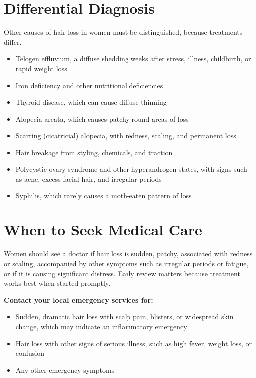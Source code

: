 \section*{Differential Diagnosis}
Other causes of hair loss in women must be distinguished, because treatments differ.
\begin{itemize}
    \item Telogen effluvium, a diffuse shedding weeks after stress, illness, childbirth, or rapid weight loss
    \item Iron deficiency and other nutritional deficiencies
    \item Thyroid disease, which can cause diffuse thinning
    \item Alopecia areata, which causes patchy round areas of loss
    \item Scarring (cicatricial) alopecia, with redness, scaling, and permanent loss
    \item Hair breakage from styling, chemicals, and traction
    \item Polycystic ovary syndrome and other hyperandrogen states, with signs such as acne, excess facial hair, and irregular periods
    \item Syphilis, which rarely causes a moth-eaten pattern of loss
\end{itemize}

\section*{When to Seek Medical Care}
Women should see a doctor if hair loss is sudden, patchy, associated with redness or scaling, accompanied by other symptoms such as irregular periods or fatigue, or if it is causing significant distress. Early review matters because treatment works best when started promptly.

\textbf{Contact your local emergency services for:}
\begin{itemize}
    \item Sudden, dramatic hair loss with scalp pain, blisters, or widespread skin change, which may indicate an inflammatory emergency
    \item Hair loss with other signs of serious illness, such as high fever, weight loss, or confusion
    \item Any other emergency symptoms
\end{itemize}

